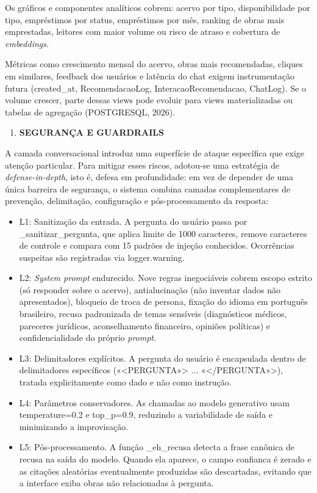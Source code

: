 \documentclass[
]{article}
\begin{document}
Os gráficos e componentes analíticos cobrem: acervo por tipo,
disponibilidade por tipo, empréstimos por status, empréstimos por mês,
ranking de obras mais emprestadas, leitores com maior volume ou risco de
atraso e cobertura de \emph{embeddings}.

Métricas como crescimento mensal do acervo, obras mais recomendadas,
cliques em similares, feedback dos usuários e latência do chat exigem
instrumentação futura (created\_at, RecomendacaoLog,
InteracaoRecomendacao, ChatLog). Se o volume crescer, parte dessas views
pode evoluir para views materializadas ou tabelas de agregação
(POSTGRESQL, 2026).

\textbf{\hfill\break
}

\begin{enumerate}
\def\labelenumi{\arabic{enumi}.}
\setcounter{enumi}{6}
\item
  \protect{}\label{_Toc230227830}{}\textbf{SEGURANÇA E
  GUARDRAILS}
\end{enumerate}

A camada conversacional introduz uma superfície de ataque específica que
exige atenção particular. Para mitigar esses riscos, adotou-se uma
estratégia de \emph{defense-in-depth}, isto é, defesa em profundidade:
em vez de depender de uma única barreira de segurança, o sistema combina
camadas complementares de prevenção, delimitação, configuração e
pós-processamento da resposta:

\begin{itemize}
\item
  L1: Sanitização da entrada. A pergunta do usuário passa por
  \_sanitizar\_pergunta, que aplica limite de 1000 caracteres, remove
  caracteres de controle e compara com 15 padrões de injeção conhecidos.
  Ocorrências suspeitas são registradas via logger.warning.
\item
  L2: \emph{System prompt} endurecido. Nove regras inegociáveis cobrem
  escopo estrito (só responder sobre o acervo), antialucinação (não
  inventar dados não apresentados), bloqueio de troca de persona,
  fixação do idioma em português brasileiro, recusa padronizada de temas
  sensíveis (diagnósticos médicos, pareceres jurídicos, aconselhamento
  financeiro, opiniões políticas) e confidencialidade do próprio
  \emph{prompt}.
\item
  L3: Delimitadores explícitos. A pergunta do usuário é encapsulada
  dentro de delimitadores específicos
  («\textless PERGUNTA»\textgreater{} ...
  «\textless/PERGUNTA»\textgreater), tratada explicitamente como dado e
  não como instrução.
\item
  L4: Parâmetros conservadores. As chamadas ao modelo generativo usam
  temperature=0.2 e top\_p=0.9, reduzindo a variabilidade de saída e
  minimizando a improvisação.
\item
  L5: Pós-processamento. A função \_eh\_recusa detecta a frase canônica
  de recusa na saída do modelo. Quando ela aparece, o campo confianca é
  zerado e as citações aleatórias eventualmente produzidas são
  descartadas, evitando que a interface exiba obras não relacionadas à
  pergunta.
\end{itemize}
\end{document}
